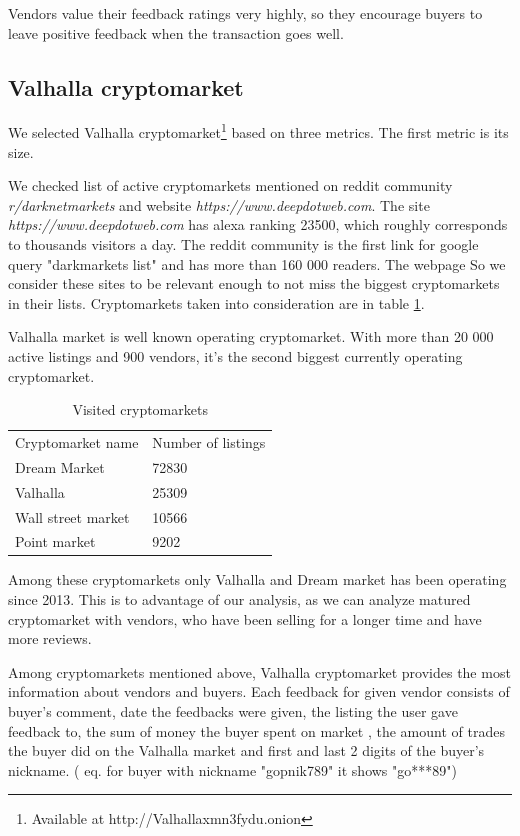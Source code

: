 \documentclass[
  digital, %
  table,   %
  lof,     %
  lot,     %
  oneside
]{fithesis3}
\begin{document}
Vendors value their feedback ratings very highly, so they encourage buyers to leave
 positive feedback when the transaction goes well.
 
\subsection{Valhalla cryptomarket}

We selected Valhalla cryptomarket\footnote{Available at http://Valhallaxmn3fydu.onion} based on three metrics.
The first metric is its size.

We checked list of active cryptomarkets mentioned on reddit community \emph{r/darknetmarkets} and website
\emph{https://www.deepdotweb.com}.
The site \emph{https://www.deepdotweb.com} has alexa ranking 23500, which roughly corresponds to thousands visitors a day.
The reddit community is the first link for google query "darkmarkets list" and 
has more than 160 000 readers. The webpage  So we consider these sites to be relevant enough to not miss
the biggest cryptomarkets in their lists. Cryptomarkets taken into consideration are in table \ref{cryptomarkets}.

Valhalla market is well known operating cryptomarket.
With more than 20 000 active listings and 900 vendors, it's the second biggest currently operating cryptomarket.

\begin{table}
    \caption{Visited cryptomarkets}
    \label{cryptomarkets}
    \begin{tabular}{|l|l|}
    Cryptomarket name & Number of listings\\
    Dream Market & 72830 \\
    Valhalla     & 25309 \\
    Wall street market   & 10566 \\
    Point market  & 9202 \\
    \end{tabular}
\end{table}

Among these cryptomarkets only Valhalla and Dream market has been operating since 2013.
This is to advantage of our analysis, as we can analyze matured cryptomarket with vendors,
who have been selling for a longer time and have more reviews.

Among cryptomarkets mentioned above,
Valhalla cryptomarket provides the most information about vendors and buyers.
Each feedback for given vendor consists of 
buyer's comment, date the feedbacks were given, the listing the user gave feedback to, the sum of money the buyer spent on market
, the amount of trades the buyer did on the Valhalla market and
first and last 2 digits of the buyer's nickname. 
( eq. for buyer with nickname "gopnik789" it shows "go***89")
\end{document}
